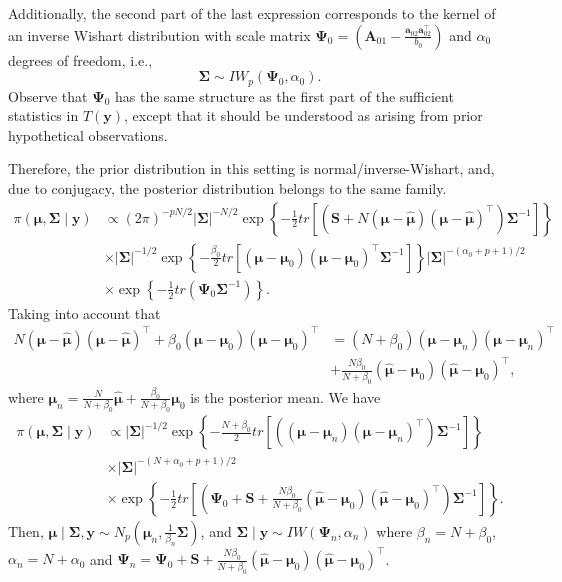 \begin{enumerate}
Additionally, the second part of the last expression corresponds to the kernel of an inverse Wishart distribution with scale matrix \( \bm{\Psi}_0 = \left( \bm{A}_{01} - \frac{\bm{a}_{02} \bm{a}_{02}^{\top}}{b_0} \right) \) and \( \alpha_0 \) degrees of freedom, i.e.,
\[
\bm{\Sigma} \sim IW_p (\bm{\Psi}_0, \alpha_0).
\]
Observe that \( \bm{\Psi}_0 \) has the same structure as the first part of the sufficient statistics in \( T(\bm{y}) \), except that it should be understood as arising from prior hypothetical observations.

Therefore, the prior distribution in this setting is normal/inverse-Wishart, and, due to conjugacy, the posterior distribution belongs to the same family.
{\footnotesize{
\begin{align}
	\pi(\bm{\mu},\bm{\Sigma}\mid \bm{y})&\propto
	(2\pi)^{-p N/2}|\bm{\Sigma}|^{-N/2}\exp\left\{-\frac{1}{2}tr\left[\left(\bm{S}+N\left(\bm{\mu}-\hat{\bm{\mu}}\right)\left(\bm{\mu}-\hat{\bm{\mu}}\right)^{\top}\right)\bm{\Sigma}^{-1}\right]\right\}\nonumber\\
	&\times |\bm{\Sigma}|^{-1/2}\exp\left\{-\frac{\beta_0}{2}tr\left[(\bm{\mu}-\bm{\mu}_0)(\bm{\mu}-\bm{\mu}_0)^{\top}\bm{\Sigma}^{-1}\right]\right\}|\bm{\Sigma}|^{-(\alpha_0+p+1)/2}\nonumber\\
	&\times\exp\left\{-\frac{1}{2}tr(\bm{\Psi}_0\bm{\Sigma}^{-1})\right\}\nonumber.
\end{align}
}}
Taking into account that
{\footnotesize{ 
\begin{align}
	N\left(\bm{\mu}-\hat{\bm{\mu}}\right)\left(\bm{\mu}-\hat{\bm{\mu}}\right)^{\top}+\beta_0\left(\bm{\mu}-\bm{\mu}_0\right)\left(\bm{\mu}-\bm{\mu}_0\right)^{\top}&=(N+\beta_0)\left(\bm{\mu}-\bm{\mu}_n\right)\left(\bm{\mu}-\bm{\mu}_n\right)^{\top}\nonumber\\
	&+\frac{N\beta_0}{N+\beta_0}\left(\hat{\bm{\mu}}-\bm{\mu}_0\right)\left(\hat{\bm{\mu}}-\bm{\mu}_0\right)^{\top},\nonumber
\end{align}
}}
where $\bm{\mu}_n=\frac{N}{N+\beta_0}\hat{\bm{\mu}}+\frac{\beta_0}{N+\beta_0}\bm{\mu}_0$ is the posterior mean. We have
{\footnotesize{ 
\begin{align}
	\pi(\bm{\mu},\bm{\Sigma}\mid \bm{y})&\propto |\bm\Sigma|^{-1/2}\exp\left\{-\frac{N+\beta_0}{2}tr\left[\left(\left(\bm{\mu}-\bm{\mu}_n\right)\left(\bm{\mu}-\bm{\mu}_n\right)^{\top}\right)\bm{\Sigma}^{-1}\right]\right\}\nonumber\\
	&\times |\bm{\Sigma}|^{-(N+\alpha_0+p+1)/2}\nonumber\\
	&\times\exp\left\{-\frac{1}{2}tr\left[\left(\bm{\Psi}_0+\bm{S}+\frac{N\beta_0}{N+\beta_0}(\hat{\bm{\mu}}-\bm{\mu}_0)(\hat{\bm{\mu}}-\bm{\mu}_0)^{\top}\right)\bm{\Sigma}^{-1}\right]\right\}.\nonumber
\end{align}
}}
Then, $\bm{\mu}\mid \bm{\Sigma},\bm{y}\sim N_p\left(\bm{\mu}_n,\frac{1}{\beta_n}\bm{\Sigma}\right)$, and $\bm{\Sigma}\mid \bm{y}\sim IW\left(\bm{\Psi}_n,\alpha_n\right)$ where $\beta_n=N+\beta_0$, $\alpha_n=N+\alpha_0$ and $\bm{\Psi}_n=\bm{\Psi}_0+\bm{S}+\frac{N\beta_0}{N+\beta_0}(\hat{\bm{\mu}}-\bm{\mu}_0)(\hat{\bm{\mu}}-\bm{\mu}_0)^{\top}$.


\end{enumerate}

